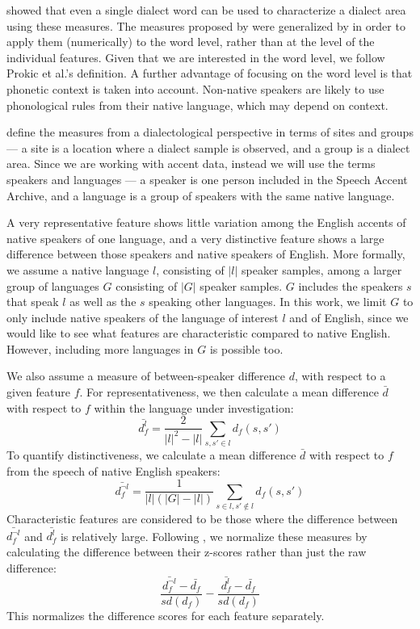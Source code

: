 \documentclass[output=paper]{LSP/langsci}
\begin{document}
\citet{prokic_detecting_2012} showed that even a single dialect word can be used to characterize a dialect area using these measures. The measures proposed by \citet{wieling_bipartite_2011} were generalized by \citet{prokic_detecting_2012} in order to apply them (numerically) to the word level, rather than at the level of the individual features. Given that we are interested in the word level, we follow Prokic et al.'s definition. A further advantage of focusing on the word level is that phonetic context is taken into account. Non-native speakers are likely to use phonological rules from their native language, which may depend on context.

\citet{prokic_detecting_2012} define the measures from a dialectological perspective in terms of sites and groups --- a site is a location where a dialect sample is observed, and a group is a dialect area. Since we are working with accent data, instead we will use the terms speakers and languages --- a speaker is one person included in the Speech Accent Archive, and a language is a group of speakers with the same native language.

A very representative feature shows little variation among the English accents of native speakers of one language, and a very distinctive feature shows a large difference between those speakers and native speakers of English. More formally, we assume a native language $l$, consisting of $|l|$ speaker samples, among a larger group of languages $G$ consisting of $|G|$ speaker samples. $G$ includes the speakers $s$ that speak $l$ as well as the $s$ speaking other languages. In this work, we limit $G$ to only include native speakers of the language of interest $l$ and of English, since we would like to see what features are characteristic compared to native English. However, including more languages in $G$ is possible too.

We also assume a measure of between-speaker difference $d$, with respect to a given feature $f$. For representativeness, we then calculate a mean difference $\bar{d}$ with respect to $f$ within the language under investigation:
\begin{equation*}
\bar{d^l_f} = \frac{2}{|l|^2 - |l|} \sum_{s,s' \in l} d_f(s,s')
\end{equation*}
To quantify distinctiveness, we calculate a mean difference $\bar{d}$ with respect to $f$ from the speech of native English speakers:
\begin{equation*}
\bar{d^{\neg l}_f} = \frac{1}{|l|(|G| - |l|)} \sum_{s \in l,s' \notin l} d_f(s,s')
\end{equation*}
Characteristic features are considered to be those where the difference between $\bar{d^{\neg l}_f}$ and $\bar{d^l_f}$ is relatively large. Following \citet{prokic_detecting_2012}, we normalize these measures by calculating the difference between their z-scores rather than just the raw difference:
\begin{equation*}
\frac{\bar{d^{\neg l}_f} - \bar{d_f}}{sd(d_f)} - \frac{\bar{d^{l}_f} - \bar{d_f}}{sd(d_f)}
\end{equation*}
This normalizes the difference scores for each feature separately.
\end{document}
